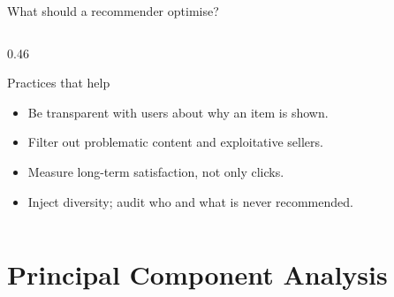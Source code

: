 \documentclass[aspectratio=169,10pt]{beamer}
\begin{document}
\begin{frame}{What should a recommender optimise?}
\begin{columns}[T,onlytextwidth]
\begin{column}{0.46\textwidth}
      \footnotesize
      \begin{block}{Practices that help}
        \begin{itemize}
          \item Be transparent with users about why an item is shown.
          \item Filter out problematic content and exploitative sellers.
          \item Measure long-term satisfaction, not only clicks.
          \item Inject diversity; audit who and what is never recommended.
        \end{itemize}
      \end{block}
    \end{column}
  \end{columns}
\end{frame}

\section{Principal Component Analysis}
\end{document}
